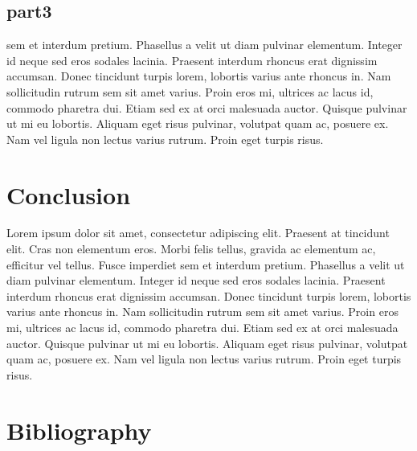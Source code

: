 \documentclass[12pt]{article}
\begin{document}
	
	
	\subsection{part3}
	
	sem et interdum pretium. Phasellus a velit ut diam pulvinar elementum. Integer id neque sed eros sodales lacinia. Praesent interdum rhoncus erat dignissim accumsan. Donec tincidunt turpis lorem, lobortis varius ante rhoncus in. Nam sollicitudin rutrum sem sit amet varius. Proin eros mi, ultrices ac lacus id, commodo pharetra dui. Etiam sed ex at orci malesuada auctor. Quisque pulvinar ut mi eu lobortis. Aliquam eget risus pulvinar, volutpat quam ac, posuere ex. Nam vel ligula non lectus varius rutrum. Proin eget turpis risus.
	
	
	\section{Conclusion}
	
	Lorem ipsum dolor sit amet, consectetur adipiscing elit. Praesent at tincidunt elit. Cras non elementum eros. Morbi felis tellus, gravida ac elementum ac, efficitur vel tellus. Fusce imperdiet sem et interdum pretium. Phasellus a velit ut diam pulvinar elementum. Integer id neque sed eros sodales lacinia. Praesent interdum rhoncus erat dignissim accumsan. Donec tincidunt turpis lorem, lobortis varius ante rhoncus in. Nam sollicitudin rutrum sem sit amet varius. Proin eros mi, ultrices ac lacus id, commodo pharetra dui. Etiam sed ex at orci malesuada auctor. Quisque pulvinar ut mi eu lobortis. Aliquam eget risus pulvinar, volutpat quam ac, posuere ex. Nam vel ligula non lectus varius rutrum. Proin eget turpis risus.
	
	\section{Bibliography}%
	
	
\end{document}
